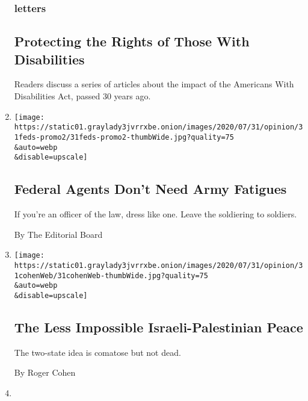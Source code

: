 \begin{enumerate}
  \hypertarget{letters-2}{%
  \subsubsection{letters}\label{letters-2}}

  \hypertarget{protecting-the-rights-of-those-with-disabilities}{%
  \subsection{Protecting the Rights of Those With
  Disabilities}\label{protecting-the-rights-of-those-with-disabilities}}

  Readers discuss a series of articles about the impact of the Americans
  With Disabilities Act, passed 30 years ago.
\item
  \href{/2020/07/31/opinion/federal-agents-trump-uniforms.html}{}

  \texttt{[image: https://static01.graylady3jvrrxbe.onion/images/2020/07/31/opinion/31feds-promo2/31feds-promo2-thumbWide.jpg?quality=75\\\&auto=webp\\\&disable=upscale]}

  \hypertarget{federal-agents-dont-need-army-fatigues}{%
  \subsection{Federal Agents Don't Need Army
  Fatigues}\label{federal-agents-dont-need-army-fatigues}}

  If you're an officer of the law, dress like one. Leave the soldiering
  to soldiers.

  By The Editorial Board
\item
  \href{/2020/07/31/opinion/israeli-palestinian-peace.html}{}

  \texttt{[image: https://static01.graylady3jvrrxbe.onion/images/2020/07/31/opinion/31cohenWeb/31cohenWeb-thumbWide.jpg?quality=75\\\&auto=webp\\\&disable=upscale]}

  \hypertarget{the-less-impossible-israeli-palestinian-peace}{%
  \subsection{The Less Impossible Israeli-Palestinian
  Peace}\label{the-less-impossible-israeli-palestinian-peace}}

  The two-state idea is comatose but not dead.

  By Roger Cohen
\item
  \href{/2020/07/31/opinion/coronavirus-testing-cuomo.html}{}


\end{enumerate}
